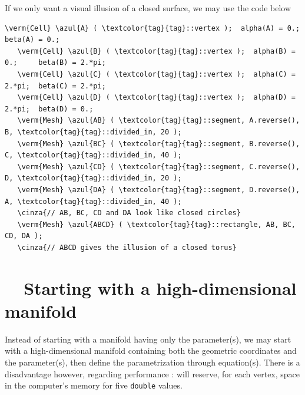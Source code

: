If we only want a visual illusion of a closed surface, we may use the code below

\begin{Verbatim}[commandchars=\\\{\},formatcom=\small\tt,baselinestretch=0.94]
   \verm{Cell} \azul{A} ( \textcolor{tag}{tag}::vertex );  alpha(A) = 0.;     beta(A) = 0.;
   \verm{Cell} \azul{B} ( \textcolor{tag}{tag}::vertex );  alpha(B) = 0.;     beta(B) = 2.*pi;
   \verm{Cell} \azul{C} ( \textcolor{tag}{tag}::vertex );  alpha(C) = 2.*pi;  beta(C) = 2.*pi;
   \verm{Cell} \azul{D} ( \textcolor{tag}{tag}::vertex );  alpha(D) = 2.*pi;  beta(D) = 0.;
   \verm{Mesh} \azul{AB} ( \textcolor{tag}{tag}::segment, A.reverse(), B, \textcolor{tag}{tag}::divided_in, 20 );
   \verm{Mesh} \azul{BC} ( \textcolor{tag}{tag}::segment, B.reverse(), C, \textcolor{tag}{tag}::divided_in, 40 );
   \verm{Mesh} \azul{CD} ( \textcolor{tag}{tag}::segment, C.reverse(), D, \textcolor{tag}{tag}::divided_in, 20 );
   \verm{Mesh} \azul{DA} ( \textcolor{tag}{tag}::segment, D.reverse(), A, \textcolor{tag}{tag}::divided_in, 40 );
   \cinza{// AB, BC, CD and DA look like closed circles}
   \verm{Mesh} \azul{ABCD} ( \textcolor{tag}{tag}::rectangle, AB, BC, CD, DA );
   \cinza{// ABCD gives the illusion of a closed torus}
\end{Verbatim}


\section{~~Starting with a high-dimensional manifold}\label{\numb section 2.\numb parag 17}

Instead of starting with a manifold having only the parameter(s), we may start with a
high-dimensional manifold containing both the geometric coordinates and the parameter(s),
then define the parametrization through equation(s).
There is a disadvantage however, regarding performance : {\maniFEM} will reserve,
for each vertex, space in the computer's memory for five {\small\tt double} values.

